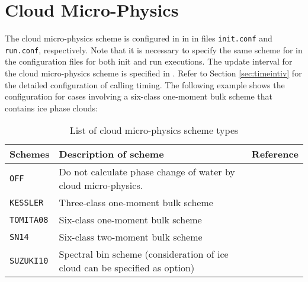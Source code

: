 

\section{Cloud Micro-Physics} \label{sec:basic_usel_microphys}
The cloud micro-physics scheme is configured in  in  in files \verb|init.conf| and \verb|run.conf|, respectively.
Note that it is necessary to specify the same scheme for  in the configuration files for both init and run executions.
The update interval for the cloud micro-physics scheme is specified in . Refer to Section \ref{sec:timeintiv} for the detailed configuration of calling timing.
The following example shows the configuration for cases involving a six-class one-moment bulk scheme that contains ice phase clouds:


\begin{table}[tbh]
\begin{center}
  \caption{List of cloud micro-physics scheme types}
  \label{tab:nml_atm_mp}
  \begin{tabularx}{150mm}{lXX} \hline
    \rowcolor[gray]{0.9}  Schemes & Description of scheme & Reference\\ \hline
     \verb|OFF|      & Do not calculate phase change of water by cloud micro-physics. &  \\
     \verb|KESSLER|  & Three-class one-moment bulk scheme & \citet{kessler_1969} \\
     \verb|TOMITA08| & Six-class one-moment bulk scheme & \citet{tomita_2008} \\
     \verb|SN14|     & Six-class two-moment bulk scheme & \citet{sn_2014} \\
     \verb|SUZUKI10| & Spectral bin scheme (consideration of ice cloud can be specified as option) & \citet{suzuki_etal_2010} \\
    \hline
  \end{tabularx}
\end{center}
\end{table}

